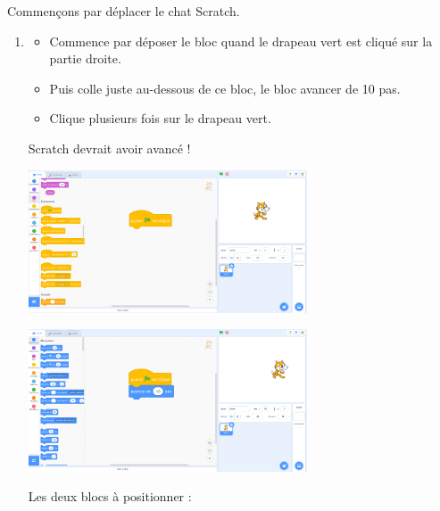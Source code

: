 \documentclass[class=report,crop=false, 12pt]{standalone}
\begin{document}




\bigskip
\bigskip


\begin{activite}

Commençons par déplacer le chat Scratch.

\begin{enumerate}
  \item
  \begin{itemize}
    \item Commence par déposer le bloc \og quand le drapeau vert est cliqué \fg{} sur la partie droite.
    \item Puis colle juste au-dessous de ce bloc, le bloc \og avancer de 10 pas\fg{}.
    \item Clique plusieurs fois sur le drapeau vert. 
  \end{itemize}

Scratch devrait avoir avancé !

\begin{center}
  \includegraphics[width=0.65\textwidth]{ecran-01-ex1a}

  \includegraphics[width=0.65\textwidth]{ecran-01-ex1b}
\end{center}  
  



Les deux blocs à positionner :
\begin{center}
\begin{scratch}
\end{scratch}
\qquad\qquad
\begin{scratch}
\end{scratch}
\end{center}    
  

\end{enumerate}
\end{activite}
\end{document}
